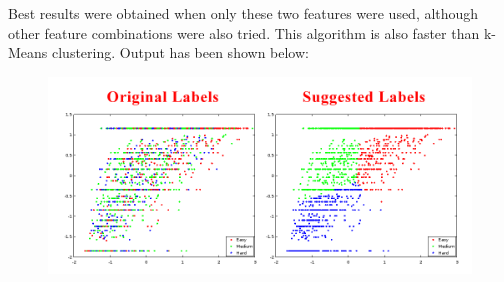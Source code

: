 \documentclass[12pt]{article}
\begin{document}
	Best results were obtained when only these two features were used, 
	although other feature combinations were also tried. This algorithm
	is also faster than k-Means	clustering. Output has been shown below:
	\begin{figure}[h]
	\includegraphics[width=\textwidth]{CompetitiveOutput}
	\end{figure}
	
\end{document}
